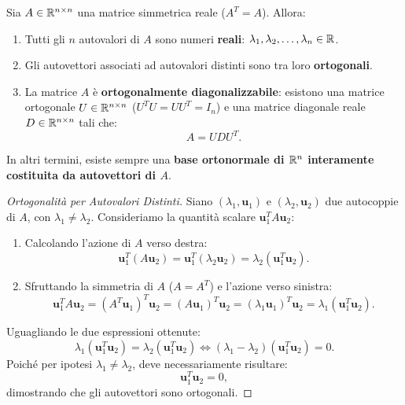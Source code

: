 \begin{theorem}
\label{thm:teorema-spettrale}
Sia $A \in \mathbb{R}^{n \times n}$ una matrice simmetrica reale ($A^T = A$). Allora:
\begin{enumerate}
    \item Tutti gli $n$ autovalori di $A$ sono numeri \textbf{reali}: $\lambda_1, \lambda_2, \dots, \lambda_n \in \mathbb{R}$.
    \item Gli autovettori associati ad autovalori distinti sono tra loro \textbf{ortogonali}.
    \item La matrice $A$ \`e \textbf{ortogonalmente diagonalizzabile}: esistono una matrice ortogonale $U \in \mathbb{R}^{n \times n}$ ($U^T U = U U^T = I_n$) e una matrice diagonale reale $D \in \mathbb{R}^{n \times n}$ tali che:
    \begin{equation}
        A = U D U^T.
    \end{equation}
\end{enumerate}
In altri termini, esiste sempre una \textbf{base ortonormale di $\mathbb{R}^n$ interamente costituita da autovettori di $A$}.
\end{theorem}

\begin{proof}[Ortogonalit\`a per Autovalori Distinti]
Siano $(\lambda_1, \mathbf{u}_1)$ e $(\lambda_2, \mathbf{u}_2)$ due autocoppie di $A$, con $\lambda_1 \neq \lambda_2$. Consideriamo la quantit\`a scalare $\mathbf{u}_1^T A \mathbf{u}_2$:
\begin{enumerate}
    \item Calcolando l'azione di $A$ verso destra:
    \begin{equation}
        \mathbf{u}_1^T (A \mathbf{u}_2) = \mathbf{u}_1^T (\lambda_2 \mathbf{u}_2) = \lambda_2 (\mathbf{u}_1^T \mathbf{u}_2).
    \end{equation}
    \item Sfruttando la simmetria di $A$ ($A = A^T$) e l'azione verso sinistra:
    \begin{equation}
        \mathbf{u}_1^T A \mathbf{u}_2 = (A^T \mathbf{u}_1)^T \mathbf{u}_2 = (A \mathbf{u}_1)^T \mathbf{u}_2 = (\lambda_1 \mathbf{u}_1)^T \mathbf{u}_2 = \lambda_1 (\mathbf{u}_1^T \mathbf{u}_2).
    \end{equation}
\end{enumerate}
Uguagliando le due espressioni ottenute:
\begin{equation}
    \lambda_1 (\mathbf{u}_1^T \mathbf{u}_2) = \lambda_2 (\mathbf{u}_1^T \mathbf{u}_2) \iff (\lambda_1 - \lambda_2) (\mathbf{u}_1^T \mathbf{u}_2) = 0.
\end{equation}
Poich\'e per ipotesi $\lambda_1 \neq \lambda_2$, deve necessariamente risultare:
\begin{equation}
    \mathbf{u}_1^T \mathbf{u}_2 = 0,
\end{equation}
dimostrando che gli autovettori sono ortogonali.
\end{proof}

